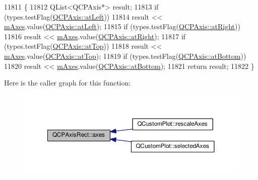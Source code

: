 \begin{DoxyCode}
11811 \{
11812   QList<QCPAxis*> result;
11813   \textcolor{keywordflow}{if} (types.testFlag(\hyperlink{class_q_c_p_axis_ae2bcc1728b382f10f064612b368bc18aaf84aa6cac6fb6099f54a2cbf7546b730}{QCPAxis::atLeft}))
11814     result << \hyperlink{class_q_c_p_axis_rect_afe7a24d2a2bea98fc552fa826350ba81}{mAxes}.value(\hyperlink{class_q_c_p_axis_ae2bcc1728b382f10f064612b368bc18aaf84aa6cac6fb6099f54a2cbf7546b730}{QCPAxis::atLeft});
11815   \textcolor{keywordflow}{if} (types.testFlag(\hyperlink{class_q_c_p_axis_ae2bcc1728b382f10f064612b368bc18aadf5509f7d29199ef2f263b1dd224b345}{QCPAxis::atRight}))
11816     result << \hyperlink{class_q_c_p_axis_rect_afe7a24d2a2bea98fc552fa826350ba81}{mAxes}.value(\hyperlink{class_q_c_p_axis_ae2bcc1728b382f10f064612b368bc18aadf5509f7d29199ef2f263b1dd224b345}{QCPAxis::atRight});
11817   \textcolor{keywordflow}{if} (types.testFlag(\hyperlink{class_q_c_p_axis_ae2bcc1728b382f10f064612b368bc18aac0ece2b680d3f545e701f75af1655977}{QCPAxis::atTop}))
11818     result << \hyperlink{class_q_c_p_axis_rect_afe7a24d2a2bea98fc552fa826350ba81}{mAxes}.value(\hyperlink{class_q_c_p_axis_ae2bcc1728b382f10f064612b368bc18aac0ece2b680d3f545e701f75af1655977}{QCPAxis::atTop});
11819   \textcolor{keywordflow}{if} (types.testFlag(\hyperlink{class_q_c_p_axis_ae2bcc1728b382f10f064612b368bc18aa220d68888516b6c3b493d144f1ba438f}{QCPAxis::atBottom}))
11820     result << \hyperlink{class_q_c_p_axis_rect_afe7a24d2a2bea98fc552fa826350ba81}{mAxes}.value(\hyperlink{class_q_c_p_axis_ae2bcc1728b382f10f064612b368bc18aa220d68888516b6c3b493d144f1ba438f}{QCPAxis::atBottom});
11821   \textcolor{keywordflow}{return} result;
11822 \}
\end{DoxyCode}


Here is the caller graph for this function\+:\nopagebreak
\begin{figure}[H]
\begin{center}
\leavevmode
\includegraphics[width=350pt]{class_q_c_p_axis_rect_a66654d51ca611ef036ded36250cd2518_icgraph}
\end{center}
\end{figure}


